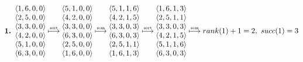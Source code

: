 \begin{align*}
  \text{\bf 1. }
  \begin{matrix}
    \langle 1, 6, 0, 0 \rangle \\
    \langle 2, 5, 0, 0 \rangle \\
    \langle 3, 3, 0, 0 \rangle \\
    \langle 4, 2, 0, 0 \rangle \\
    \langle 5, 1, 0, 0 \rangle \\
    \langle 6, 3, 0, 0 \rangle \\
  \end{matrix}
  \stackrel{\text{\tiny \tt sort}}{\longmapsto}
  \begin{matrix}
    \langle 5, 1, 0, 0 \rangle \\
    \langle 4, 2, 0, 0 \rangle \\
    \langle 3, 3, 0, 0 \rangle \\
    \langle 6, 3, 0, 0 \rangle \\
    \langle 2, 5, 0, 0 \rangle \\
    \langle 1, 6, 0, 0 \rangle \\
  \end{matrix}
  \stackrel{\text{\tiny \tt scan}}{\longmapsto}
  \begin{matrix}
    \langle 5, 1, 1, 6 \rangle \\
    \langle 4, 2, 1, 5 \rangle \\
    \langle 3, 3, 0, 3 \rangle \\
    \langle 6, 3, 0, 3 \rangle \\
    \langle 2, 5, 1, 1 \rangle \\
    \langle 1, 6, 1, 3 \rangle \\
  \end{matrix}
  \stackrel{\text{\tiny \tt sort}}{\longmapsto}
  \begin{matrix}
    \langle 1, 6, 1, 3 \rangle \\
    \langle 2, 5, 1, 1 \rangle \\
    \langle 3, 3, 0, 3 \rangle \\
    \langle 4, 2, 1, 5 \rangle \\
    \langle 5, 1, 1, 6 \rangle \\
    \langle 6, 3, 0, 3 \rangle \\
  \end{matrix}
  \stackrel{\text{\tiny \tt scan}}{\longmapsto}
  \begin{matrix}
    rank(1) + 1 = 2,\ succ(1) = 3 \\

\end{matrix}
\end{align*}
